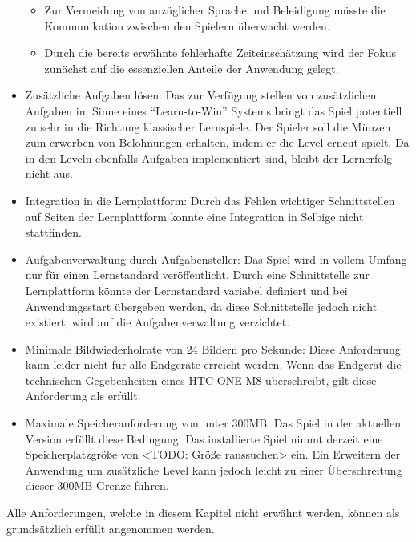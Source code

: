 \begin{itemize}
\begin{itemize}
        \item{Zur Vermeidung von anzüglicher Sprache und Beleidigung müsste die Kommunikation zwischen den Spielern überwacht werden.}
        \item{Durch die bereits erwähnte fehlerhafte Zeiteinschätzung wird der Fokus zunächst auf die essenziellen Anteile der Anwendung gelegt.}
    \end{itemize}
    \item{\label{zusätzlicheAufgaben}Zusätzliche Aufgaben lösen: Das zur Verfügung stellen von zusätzlichen Aufgaben im Sinne eines \enquote{Learn-to-Win} Systems bringt das Spiel potentiell zu sehr in die Richtung klassischer Lernspiele. Der Spieler soll die Münzen zum erwerben von Belohnungen erhalten, indem er die Level erneut spielt. Da in den Leveln ebenfalls Aufgaben implementiert sind, bleibt der Lernerfolg nicht aus.}
    \item{Integration in die Lernplattform: Durch das Fehlen wichtiger Schnittstellen auf Seiten der Lernplattform konnte eine Integration in Selbige nicht stattfinden.}
    \item{Aufgabenverwaltung durch Aufgabensteller: Das Spiel wird in vollem Umfang nur für einen Lernstandard veröffentlicht. Durch eine Schnittstelle zur Lernplattform könnte der Lernstandard variabel definiert und bei Anwendungsstart übergeben werden, da diese Schnittstelle jedoch nicht existiert, wird auf die Aufgabenverwaltung verzichtet.}
    \item{Minimale Bildwiederholrate von 24 Bildern pro Sekunde: Diese Anforderung kann leider nicht für alle Endgeräte erreicht werden. Wenn das Endgerät die technischen Gegebenheiten eines HTC ONE M8 überschreibt, gilt diese Anforderung als erfüllt.}
    \item{Maximale Speicheranforderung von unter 300MB: Das Spiel in der aktuellen Version erfüllt diese Bedingung. Das installierte Spiel nimmt derzeit eine Speicherplatzgröße von <TODO: Größe raussuchen> ein. Ein Erweitern der Anwendung um zusätzliche Level kann jedoch leicht zu einer Überschreitung dieser 300MB Grenze führen.}
\end{itemize}
Alle Anforderungen, welche in diesem Kapitel nicht erwähnt werden, können als grundsätzlich erfüllt angenommen werden.


